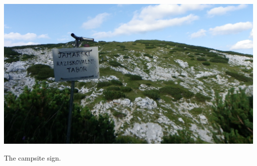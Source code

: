 \begin{pagefigure}
\checkoddpage \ifoddpage \forcerectofloat \else \forceversofloat \fi
   \centering
\includegraphics[width = \textwidth]{2012/overview/2012-08-08-19.13.30-Rhys Tyers-Pentax X90-IMGP3418--orig.jpg}
\caption{The campsite sign. } \label{camp sign}
\end{pagefigure}